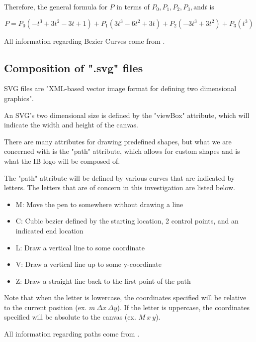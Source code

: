 \documentclass[letterpaper, 12pt]{article}
\begin{document}
Therefore, the general formula for \(P\) in terms of
\(P_0, P_1, P_2, P_3, \text{and} t\) is

\begin{equation} \label{eq:pFormula}
    P = P_0(-t^3+3t^2-3t+1) + P_1(3t^3-6t^2+3t) + P_2(-3t^3+3t^2) + P_3(t^3)
\end{equation}

All information regarding Bezier Curves come from \cite{holmerBeautyBezierCurves2021}.

\subsection{Composition of ".svg" files}

SVG files are "XML-based vector image format for defining two dimensional
graphics"\cite{SVG2023}.

An SVG's two dimensional size is defined by the "viewBox" attribute,
which will indicate the width and height of the canvas.

There are many attributes for drawing predefined shapes, but what
we are concerned with is the "path" attribute, which allows for custom
shapes and is what the IB logo will be composed of.

The "path" attribute will be defined by various curves that are indicated
by letters. The letters that are of concern in this investigation are
listed below.
\begin{itemize}
    \item M: Move the pen to somewhere without drawing a line
    \item C: Cubic bezier defined by the starting location, 2 control points, and an indicated end location
    \item L: Draw a vertical line to some coordinate
    \item V: Draw a vertical line up to some y-coordinate
    \item Z: Draw a straight line back to the first point of the path
\end{itemize}

Note that when the letter is lowercase, the coordinates specified will
be relative to the current position (ex. \(m~\Delta x~\Delta y\)). If the letter is uppercase, the
coordinates specified will be absolute to the canvas (ex. \(M~x~y\)).

All information regarding paths come from \cite{mozilladevelopernetworkPathsSVGScalable2023}.
\end{document}
